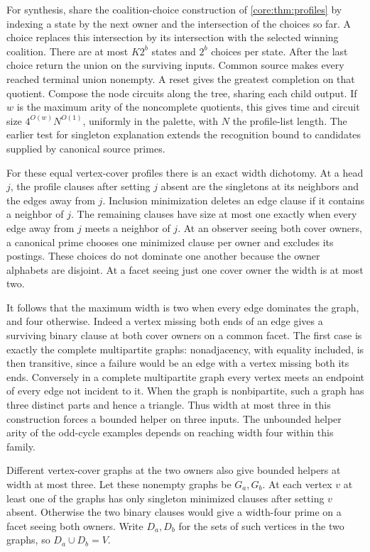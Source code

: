 For synthesis, share the coalition-choice construction
of \cref{core:thm:profiles} by indexing a state by
the next owner and the intersection of the choices
so far. A choice replaces this intersection by its
intersection with the selected winning coalition.
There are at most $K2^b$ states and $2^b$ choices per
state. After the last choice return the union on the
surviving inputs. Common source makes every reached
terminal union nonempty. A reset gives the greatest
completion on that quotient. Compose the node
circuits along the tree, sharing each child output.
If $w$ is the maximum arity of the noncomplete
quotients, this gives time and circuit size
$4^{O(w)}N^{O(1)}$, uniformly in the palette, with
$N$ the profile-list length. The earlier test for
singleton explanation extends the recognition bound
to candidates supplied by canonical source primes.

For these equal vertex-cover profiles there is an exact
width dichotomy. At a head $j$, the profile clauses
after setting $j$ absent are the singletons at its
neighbors and the edges away from $j$. Inclusion
minimization deletes an edge clause if it contains a
neighbor of $j$. The remaining clauses have size at most
one exactly when every edge away from $j$ meets a
neighbor of $j$. At an observer seeing both cover owners,
a canonical prime chooses one minimized clause per
owner and excludes its postings. These choices do not
dominate one another because the owner alphabets are
disjoint. At a facet seeing just one cover owner the
width is at most two.

It follows that the maximum width is two when every
edge dominates the graph, and four otherwise. Indeed
a vertex missing both ends of an edge gives a surviving
binary clause at both cover owners on a common facet.
The first case is exactly the complete multipartite
graphs: nonadjacency, with equality included, is then
transitive, since a failure would be an edge with a
vertex missing both its ends. Conversely in a complete
multipartite graph every vertex meets an endpoint of
every edge not incident to it. When the graph is
nonbipartite, such a graph has three distinct parts
and hence a triangle. Thus width at most three in this
construction forces a bounded helper on three inputs.
The unbounded helper arity of the odd-cycle examples
depends on reaching width four within this family.

Different vertex-cover graphs at the two owners also
give bounded helpers at width at most three. Let these
nonempty graphs be $G_a,G_b$. At each vertex $v$ at
least one of the graphs has only singleton minimized
clauses after setting $v$ absent. Otherwise the two
binary clauses would give a width-four prime on a
facet seeing both owners. Write $D_a,D_b$ for the
sets of such vertices in the two graphs, so
$D_a\cup D_b=V$.


